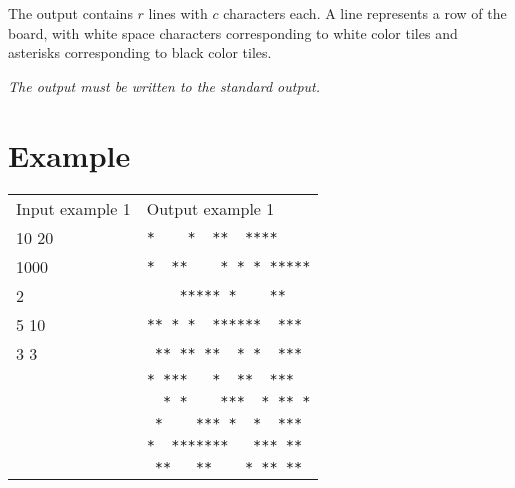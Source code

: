 \documentclass{article}
\begin{document}
The output contains $r$ lines with $c$ characters each. A line represents a row of
the board, with white space characters corresponding to white color tiles and asterisks
corresponding to black color tiles.

\textit{The output must be written to the standard output.}

\section*{Example}

\begin{table}[!ht]
    \begin{tabular}{|l|l|}
        \hline
        Input example 1 & Output example 1 \\
        10 20 &\texttt{*\ \ \ \ *\ \ **\ \ ****\ \ \ \ }\\
        1000  &\texttt{*\ \ **\ \ \ \ *\ *\ *\ *****}\\
        2     &\texttt{\ \ \ \ *****\ *\ \ \ \ **\ \ \ }\\
        5 10  &\texttt{**\ *\ *\ \ ******\ \ ***\ }\\
        3 3   &\texttt{\ **\ **\ **\ \ *\ *\ \ ***\ }\\
              &\texttt{*\ ***\ \ \ *\ \ **\ \ ***\ \ }\\
              &\texttt{\ \ *\ *\ \ \ \ ***\ \ *\ **\ *}\\
              &\texttt{\ *\ \ \ \ ***\ *\ \ *\ \ ***\ }\\
              &\texttt{*\ \ *******\ \ \ ***\ **\ }\\
              &\texttt{\ **\ \ \ **\ \ \ \ *\ **\ **\ }\\
        \hline
   \end{tabular}
\end{table}
\end{document}
